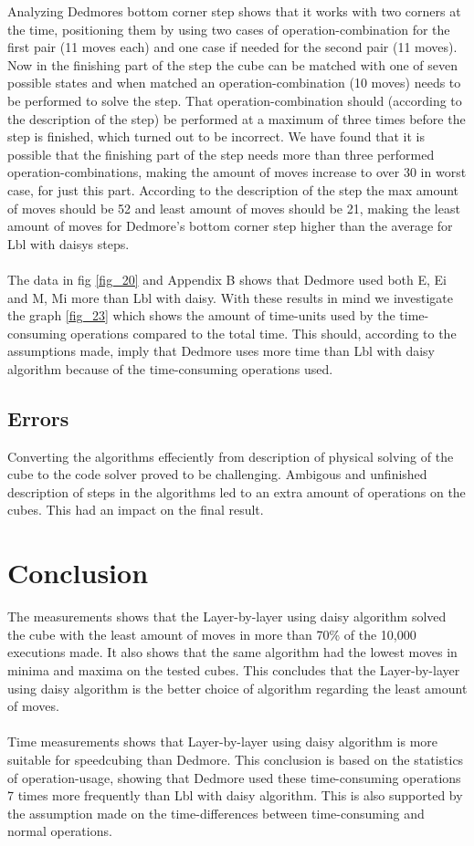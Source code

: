 \documentclass[a4paper,11pt]{kth-mag}
\begin{document}
Analyzing Dedmores bottom corner step shows that it works with two corners at the time, positioning them by using two cases of operation-combination for the first pair (11 moves each) and one case if needed for the second pair (11 moves). Now in the finishing part of the step the cube can be matched with one of seven possible states and when matched an operation-combination (10 moves) needs to be performed to solve the step. That operation-combination should (according to the description of the step) be performed at a maximum of three times before the step is finished, which turned out to be incorrect. We have found that it is possible that the finishing part of the step needs more than three performed operation-combinations, making the amount of moves increase to over 30 in worst case, for just this part. According to the description of the step the max amount of moves should be 52 and least amount of moves should be 21, making the least amount of moves for Dedmore's bottom corner step higher than the average for Lbl with daisys steps.\\\\   
The data in fig \ref{fig_20} and Appendix B shows that Dedmore used both E, Ei and M, Mi more than Lbl with daisy. With these results in mind we investigate the graph \ref{fig_23} which shows the amount of time-units used by the time-consuming operations compared to the total time. This should, according to the assumptions made, imply that Dedmore uses more time than Lbl with daisy algorithm because of the time-consuming operations used.   		     


\section{Errors}
Converting the algorithms effeciently from description of physical solving of the cube to the code solver proved to be challenging. Ambigous and unfinished description of steps in the algorithms led to an extra amount of operations on the cubes. This had an impact on the final result.

      

\chapter{Conclusion}
The measurements shows that the Layer-by-layer using daisy algorithm solved the cube with the least amount of moves in more than 70\% of the 10,000 executions made. It also shows that the same algorithm had the lowest moves in minima and maxima on the tested cubes. This concludes that the Layer-by-layer using daisy algorithm is the better choice of algorithm regarding the least amount of moves.\\\\
Time measurements shows that Layer-by-layer using daisy algorithm is more suitable for speedcubing than Dedmore. This conclusion is based on the statistics of operation-usage, showing that Dedmore used these time-consuming operations 7 times more frequently than Lbl with daisy algorithm.
This is also supported by the assumption made on the time-differences between time-consuming and normal operations.
\end{document}
